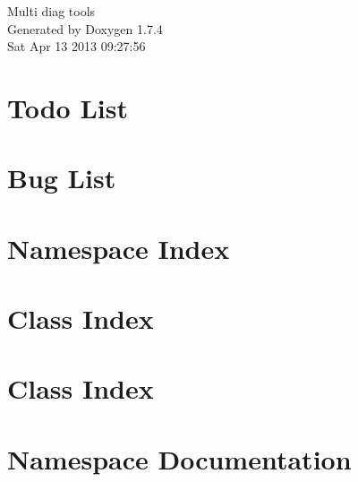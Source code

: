 \documentclass[a4paper]{book}
\begin{document}
\hypersetup{pageanchor=false}
\begin{titlepage}
\vspace*{7cm}
\begin{center}
{\Large Multi diag tools }\\
\vspace*{1cm}
{\large Generated by Doxygen 1.7.4}\\
\vspace*{0.5cm}
{\small Sat Apr 13 2013 09:27:56}\\
\end{center}
\end{titlepage}
\clearemptydoublepage
{}
\tableofcontents
\clearemptydoublepage
{}
\hypersetup{pageanchor=true}
\chapter{Todo List}
\label{todo}
\hypertarget{todo}{}

\chapter{Bug List}
\label{bug}
\hypertarget{bug}{}

\chapter{Namespace Index}

\chapter{Class Index}

\chapter{Class Index}

\chapter{Namespace Documentation}

\end{document}
